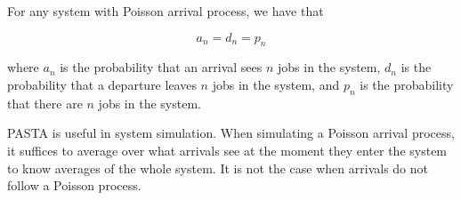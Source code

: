 \begin{theorem}
\label{thm:pasta}

	For any system with Poisson arrival process, we have that

	\begin{equation}
		a_{n} = d_{n} = p_{n}
	\end{equation}	
	
	where 
	$a_{n}$ is the probability that an arrival sees $n$ jobs in the system,
	$d_{n}$ is the probability that a departure leaves $n$ jobs in the system, and
	$p_{n}$ is the probability that there are $n$ jobs in the system.
	
\end{theorem}

PASTA is useful in system simulation. When simulating a Poisson arrival process, it suffices to average over what arrivals see at the moment they enter the system to know averages of the whole system. It is not the case when arrivals do not follow a Poisson process.